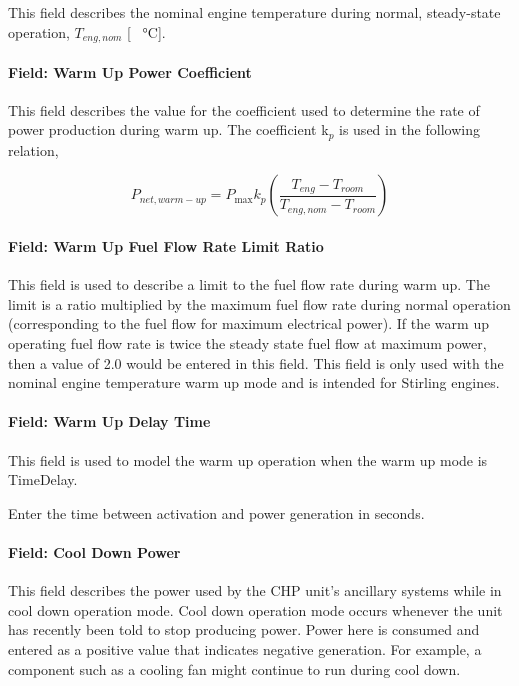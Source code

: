 This field describes the nominal engine temperature during normal, steady-state operation, \({T_{eng,nom}}\) {[} \SI{}{\celsius}{]}.

\paragraph{Field: Warm Up Power Coefficient}\label{field-warm-up-power-coefficient}

This field describes the value for the coefficient used to determine the rate of power production during warm up. The coefficient k\(_{p}\) is used in the following relation,

\begin{equation}
{P_{net,warm - up}} = {P_{\max }}{k_p}\left( {\frac{{{T_{eng}} - {T_{room}}}}{{{T_{eng,nom}} - {T_{room}}}}} \right)
\end{equation}

\paragraph{Field: Warm Up Fuel Flow Rate Limit Ratio}\label{field-warm-up-fuel-flow-rate-limit-ratio}

This field is used to describe a limit to the fuel flow rate during warm up. The limit is a ratio multiplied by the maximum fuel flow rate during normal operation (corresponding to the fuel flow for maximum electrical power). If the warm up operating fuel flow rate is twice the steady state fuel flow at maximum power, then a value of 2.0 would be entered in this field. This field is only used with the nominal engine temperature warm up mode and is intended for Stirling engines.

\paragraph{Field: Warm Up Delay Time}\label{field-warm-up-delay-time}

This field is used to model the warm up operation when the warm up mode is TimeDelay.

Enter the time between activation and power generation in seconds.

\paragraph{Field: Cool Down Power}\label{field-cool-down-power}

This field describes the power used by the CHP unit's ancillary systems while in cool down operation mode. Cool down operation mode occurs whenever the unit has recently been told to stop producing power. Power here is consumed and entered as a positive value that indicates negative generation. For example, a component such as a cooling fan might continue to run during cool down.

